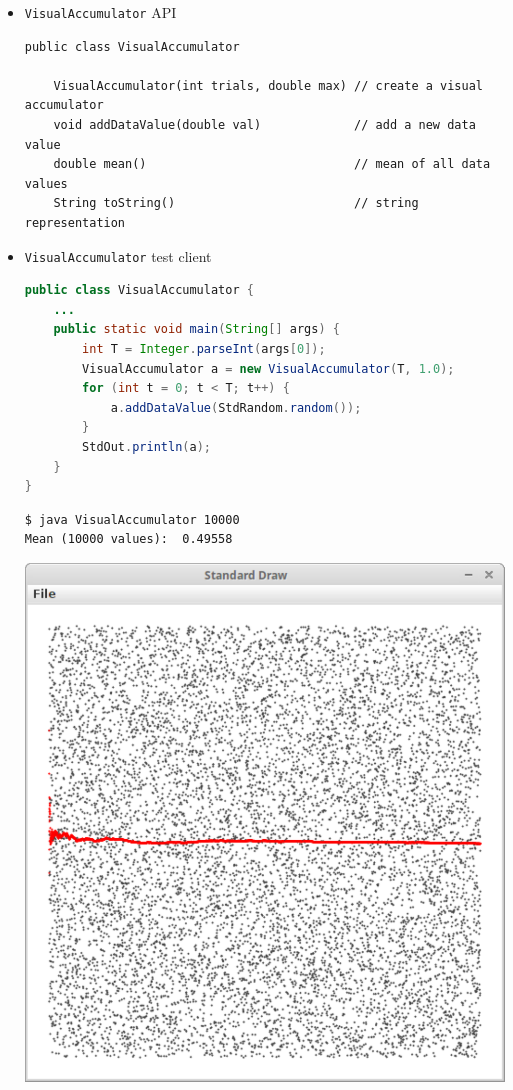 \documentclass[8pt,a4paper,compress]{beamer}
\begin{document}
\begin{frame}[fragile]
\begin{itemize}
\item \lstinline{VisualAccumulator} API
\begin{lstlisting}[language={},mathescape]
public class VisualAccumulator

    VisualAccumulator(int trials, double max) // create a visual accumulator
    void addDataValue(double val)             // add a new data value
    double mean()                             // mean of all data values
    String toString()                         // string representation
\end{lstlisting}


\item \lstinline{VisualAccumulator} test client
\begin{lstlisting}[language=Java]
public class VisualAccumulator {
    ...
    public static void main(String[] args) {
        int T = Integer.parseInt(args[0]);
        VisualAccumulator a = new VisualAccumulator(T, 1.0);
        for (int t = 0; t < T; t++) {
            a.addDataValue(StdRandom.random());
        }
        StdOut.println(a);
    }
}
\end{lstlisting}

\begin{minipage}{160pt}
\begin{lstlisting}[language={}]
$ java VisualAccumulator 10000
Mean (10000 values):  0.49558
\end{lstlisting}
\end{minipage}%
\begin{minipage}{120pt}
\hfill \includegraphics[scale=0.13]{./figures/visual_acc.pdf}
\end{minipage}
\end{itemize}
\end{frame}
\end{document}
